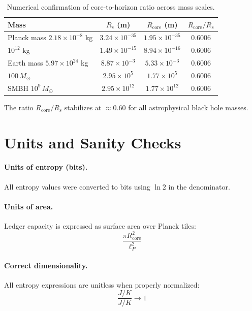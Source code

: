 \documentclass[a4paper, 12pt, oneside]{book}
\numberwithin{equation}{chapter}
\begin{document}
\begin{table}[ht]
\centering
\renewcommand{\arraystretch}{1.2}
\begin{tabular}{lccc}
\toprule
\textbf{Mass} & \( R_s \) (m) & \( R_{\text{core}} \) (m) & \( R_{\text{core}} / R_s \) \\
\midrule
Planck mass \(2.18 \times10^{-8}\) kg & \(3.24 \times10^{-35}\) & \(1.95 \times10^{-35}\) & 0.6006 \\
\(10^{12}\) kg & \(1.49 \times10^{-15}\) & \(8.94 \times10^{-16}\) & 0.6006 \\
Earth mass \(5.97 \times10^{24}\) kg & \(8.87 \times10^{-3}\) & \(5.33 \times10^{-3}\) & 0.6006 \\
\(100\,M_\odot\) & \(2.95 \times10^{5}\) & \(1.77 \times10^{5}\) & 0.6006 \\
SMBH \(10^{9}\,M_\odot\) & \(2.95 \times10^{12}\) & \(1.77 \times10^{12}\) & 0.6006 \\
\bottomrule
\end{tabular}
\caption[Numerical confirmation of core-to-horizon ratio]{Numerical confirmation of core-to-horizon ratio across mass scales.}
\label{tab:core-confirmation}
\end{table}

The ratio \( R_{\text{core}} / R_s \) stabilizes at \(\approx 0.60\)  
for all astrophysical black hole masses.

\section{Units and Sanity Checks}
\label{sec:Sanity}

\paragraph{Units of entropy (bits).}
All entropy values were converted to bits using \( \ln 2 \) in the denominator.

\paragraph{Units of area.}
Ledger capacity is expressed as surface area over Planck tiles:
\[
    \frac{\pi R_{\text{core}}^2}{\ell_P^2}
\]

\paragraph{Correct dimensionality.}
All entropy expressions are unitless when properly normalized:
\[
    \frac{J/K}{J/K} \to 1
\]
\end{document}
